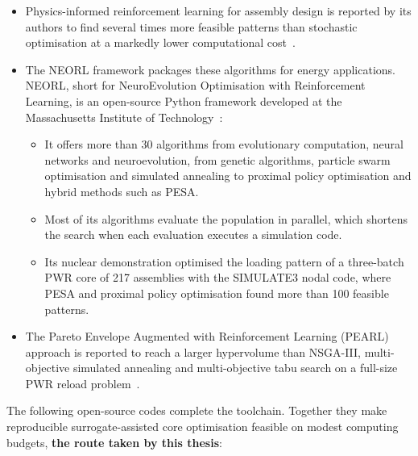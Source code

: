 \begin{itemize}
  \item Physics-informed reinforcement learning for assembly design is
        reported by its authors to find several times more feasible
        patterns than stochastic optimisation at a markedly lower
        computational cost~\cite{radaideh_2021_rl}.

  \item The NEORL framework packages these algorithms for energy
        applications. NEORL, short for NeuroEvolution Optimisation with
        Reinforcement Learning, is an open-source Python framework
        developed at the Massachusetts Institute of
        Technology~\cite{radaideh_2023_neorl}:

        \begin{itemize}
          \item It offers more than 30 algorithms from evolutionary
                computation, neural networks and neuroevolution, from
                genetic algorithms, particle swarm optimisation and
                simulated annealing to proximal policy optimisation and
                hybrid methods such as PESA.

          \item Most of its algorithms evaluate the population in
                parallel, which shortens the search when each evaluation
                executes a simulation code.

          \item Its nuclear demonstration optimised the loading pattern of
                a three-batch PWR core of 217 assemblies with the SIMULATE3
                nodal code, where PESA and proximal policy optimisation
                found more than 100 feasible patterns.
        \end{itemize}

  \item The Pareto Envelope Augmented with Reinforcement Learning (PEARL)
        approach is reported to reach a larger hypervolume than NSGA-III,
        multi-objective simulated annealing and multi-objective tabu
        search on a full-size PWR reload
        problem~\cite{seurin_2024_pearl}.
\end{itemize}

The following open-source codes complete the toolchain. Together they
make reproducible surrogate-assisted core optimisation feasible on modest
computing budgets, \textbf{the route taken by this thesis}:

